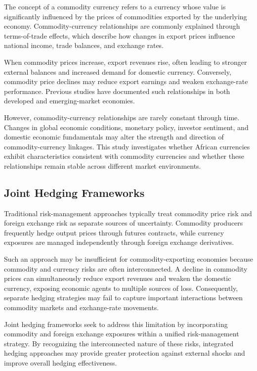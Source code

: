 \documentclass{article}
\begin{document}
The concept of a commodity currency refers to a currency whose value is significantly influenced by the prices of commodities exported by the underlying economy. Commodity-currency relationships are commonly explained through terms-of-trade effects, which describe how changes in export prices influence national income, trade balances, and exchange rates.

When commodity prices increase, export revenues rise, often leading to stronger external balances and increased demand for domestic currency. Conversely, commodity price declines may reduce export earnings and weaken exchange-rate performance. Previous studies have documented such relationships in both developed and emerging-market economies.

However, commodity-currency relationships are rarely constant through time. Changes in global economic conditions, monetary policy, investor sentiment, and domestic economic fundamentals may alter the strength and direction of commodity-currency linkages. This study investigates whether African currencies exhibit characteristics consistent with commodity currencies and whether these relationships remain stable across different market environments.

\subsection{Joint Hedging Frameworks}

Traditional risk-management approaches typically treat commodity price risk and foreign exchange risk as separate sources of uncertainty. Commodity producers frequently hedge output prices through futures contracts, while currency exposures are managed independently through foreign exchange derivatives.

Such an approach may be insufficient for commodity-exporting economies because commodity and currency risks are often interconnected. A decline in commodity prices can simultaneously reduce export revenues and weaken the domestic currency, exposing economic agents to multiple sources of loss. Consequently, separate hedging strategies may fail to capture important interactions between commodity markets and exchange-rate movements.

Joint hedging frameworks seek to address this limitation by incorporating commodity and foreign exchange exposures within a unified risk-management strategy. By recognizing the interconnected nature of these risks, integrated hedging approaches may provide greater protection against external shocks and improve overall hedging effectiveness.
\end{document}
